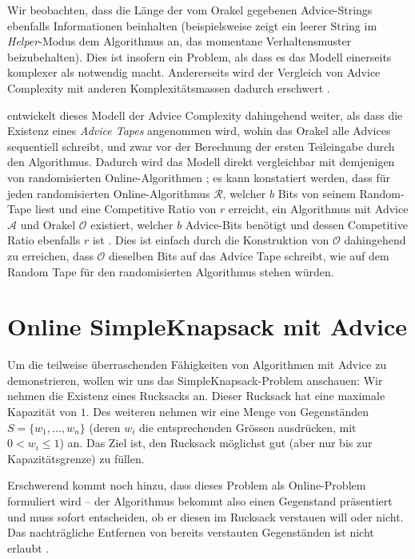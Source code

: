 \documentclass[11pt,abstracton]{scrreprt} %
\theoremstyle{definition}
\begin{document}
\bigskip

Wir beobachten, dass die Länge der vom Orakel gegebenen Advice-Strings ebenfalls Informationen beinhalten (beispielsweise zeigt ein leerer String im {\sl Helper}-Modus dem Algorithmus an, das momentane Verhaltensmuster beizubehalten). Dies ist insofern ein Problem, als dass es das Modell einerseits komplexer als notwendig macht. Andererseits wird der Vergleich von Advice Complexity mit anderen Komplexitätsmassen dadurch erschwert \cite{BKK}.

\cite{BKKR} entwickelt dieses Modell der Advice Complexity dahingehend weiter, als dass die Existenz eines {\sl Advice Tapes} angenommen wird, wohin das Orakel alle Advices sequentiell schreibt, und zwar vor der Berechnung der ersten Teileingabe durch den Algorithmus. Dadurch wird das Modell direkt vergleichbar mit demjenigen von randomisierten Online-Algorithmen \cite{BKK}; es kann konstatiert werden, dass für jeden randomisierten Online-Algorithmus $\mathcal{R}$, welcher $b$ Bits von seinem Random-Tape liest und eine Competitive Ratio von $r$ erreicht, ein Algorithmus mit Advice $\mathcal{A}$ und Orakel $\mathcal{O}$ existiert, welcher $b$ Advice-Bits benötigt und dessen Competitive Ratio ebenfalls $r$ ist \cite{BKKR}. Dies ist einfach durch die Konstruktion von $\mathcal{O}$ dahingehend zu erreichen, dass $\mathcal{O}$ dieselben Bits auf das Advice Tape schreibt, wie auf dem Random Tape für den randomisierten Algorithmus stehen würden.

\section{Online {\sc SimpleKnapsack} mit Advice}

Um die teilweise überraschenden Fähigkeiten von Algorithmen mit Advice zu demonstrieren, wollen wir uns das {\sc SimpleKnapsack}-Problem anschauen: Wir nehmen die Existenz eines Rucksacks an. Dieser Rucksack hat eine maximale Kapazität von $1$. Des weiteren nehmen wir eine Menge von Gegenständen $S = \{ w_1, \dots, w_n \}$ (deren $w_i$ die entsprechenden Grössen ausdrücken, mit $0 < w_i \le 1$) an. Das Ziel ist, den Rucksack möglichst gut (aber nur bis zur Kapazitätsgrenze) zu füllen.

Erschwerend kommt noch hinzu, dass dieses Problem als Online-Problem formuliert wird -- der Algorithmus bekommt also einen Gegenstand präsentiert und muss sofort entscheiden, ob er diesen im Rucksack verstauen will oder nicht. Das nachträgliche Entfernen von bereits verstauten Gegenständen ist nicht erlaubt \cite{knapsack}.
\end{document}
